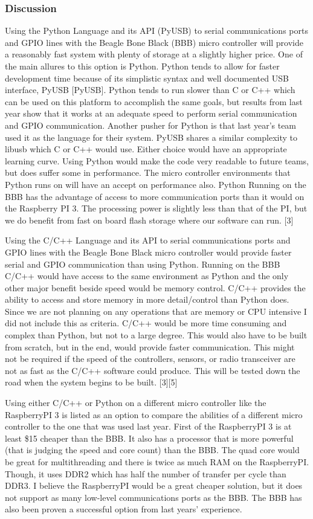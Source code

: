\documentclass[10pt,draftclsnofoot,onecolumn]{IEEEtran}
\begin{document}
\subsubsection{Discussion}
Using the Python Language and its API (PyUSB) to serial communications ports and GPIO lines with the Beagle Bone Black (BBB) micro controller will provide a reasonably fast system with plenty of storage at a slightly higher price. One of the main allures to this option is Python. Python tends to allow for faster development time because of its simplistic syntax and well documented USB interface, PyUSB [PyUSB]. Python tends to run slower than C or C++ which can be used on this platform to accomplish the same goals, but results from last year show that it works at an adequate speed to perform serial communication and GPIO communication. Another pusher for Python is that last year’s team used it as the language for their system. PyUSB shares a similar complexity to libusb which C or C++ would use. Either choice would have an appropriate learning curve. Using Python would make the code very readable to future teams, but does suffer some in performance. The micro controller environments that Python runs on will have an accept on performance also. Python Running on the BBB has the advantage of access to more communication ports than it would on the Raspberry PI 3. The processing power is slightly less than that of the PI, but we do benefit from fast on board flash storage where our software can run. [3]\par
Using the C/C++ Language and its API to serial communications ports and GPIO lines with the Beagle Bone Black micro controller would provide faster serial and GPIO communication than using Python. Running on the BBB C/C++ would have access to the same environment as Python and the only other major benefit beside speed would be memory control. C/C++ provides the ability to access and store memory in more detail/control than Python does. Since we are not planning on any operations that are memory or CPU intensive I did not include this as criteria. C/C++ would be more time consuming and complex than Python, but not to a large degree. This would also have to be built from scratch, but in the end, would provide faster communication. This might not be required if the speed of the controllers, sensors, or radio transceiver are not as fast as the C/C++ software could produce. This will be tested down the road when the system begins to be built. [3][5]\par
Using either C/C++ or Python on a different micro controller like the RaspberryPI 3 is listed as an option to compare the abilities of a different micro controller to the one that was used last year. First of the RaspberryPI 3 is at least \$15 cheaper than the BBB. It also has a processor that is more powerful (that is judging the speed and core count) than the BBB. The quad core would be great for multithreading and there is twice as much RAM on the RaspberryPI. Though, it uses DDR2 which has half	the number of transfer per cycle than DDR3. I believe the RaspberryPI would be a great cheaper solution, but it does not support as many low-level communications ports as the BBB. The BBB has also been proven a successful option from last years’ experience.\\
\end{document}

